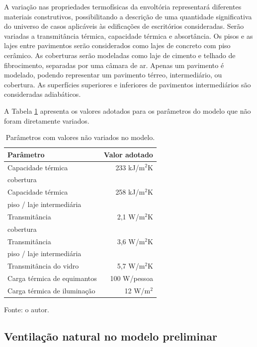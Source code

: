 \documentclass[brazil,hardcopy,openany,a5paper]{ufscthesis}
\begin{document}
		A variação nas propriedades termofísicas da envoltória representará diferentes materiais construtivos, possibilitando a descrição de uma quantidade significativa do universo de casos aplicáveis às edificações de escritórios consideradas. Serão variadas a transmitância térmica, capacidade térmica e absortância. Os pisos e as lajes entre pavimentos serão considerados como lajes de concreto com piso cerâmico. As coberturas serão modeladas como laje de cimento e telhado de fibrocimento, separadas por uma câmara de ar. Apenas um pavimento é modelado, podendo representar um pavimento térreo, intermediário, ou cobertura. As superfícies superiores e inferiores de pavimentos intermediários são consideradas adiabáticos. 
		
		A Tabela \ref{table:lajecob} apresenta os valores adotados para os parâmetros do modelo que não foram diretamente variados.
		
		\begin{table}[h]
			\centering
			\caption{Parâmetros com valores não variados no modelo.}
			\label{table:lajecob}
			\begin{tabular}{|l |r |}
				\hline
				\textbf{Parâmetro} & \textbf{Valor adotado} \\
				\hline
				Capacidade térmica & 233 kJ/m$^2$K \\
				cobertura &  \\
				\hline
				Capacidade térmica & 258 kJ/m$^2$K \\
				piso / laje intermediária &  \\
				\hline
				Transmitância & 2,1 W/m$^2$K \\
				cobertura &  \\
				\hline
				Transmitância & 3,6 W/m$^2$K \\
				piso / laje intermediária &  \\
				\hline
				Transmitância do vidro & 5,7 W/m$^2$K \\
				\hline
				Carga térmica de equimantos & 100 W/pessoa \\
				\hline
				Carga térmica de iluminação & 12 W/m$^2$ \\
				\hline
			\end{tabular}
			\begin{flushleft}
				Fonte: o autor.
			\end{flushleft}				
		\end{table}
		
		\subsection{Ventilação natural no modelo preliminar}
		
\end{document}
